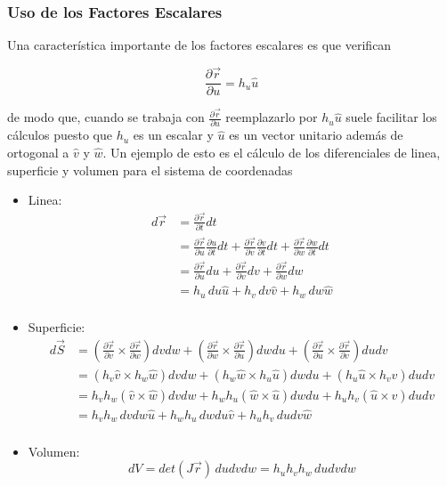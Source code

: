 \subsubsection{Uso de los Factores Escalares}

Una característica importante de los factores escalares es que verifican

\[\frac{\partial\Vec{r}}{\partial u} = h_u\hat{u}\]

de modo que, cuando se trabaja con $\frac{\partial\Vec{r}}{\partial u}$ reemplazarlo por $h_u\hat{u}$ suele facilitar los cálculos puesto que $h_u$ es un escalar y $\hat{u}$ es un vector unitario además de ortogonal a $\hat{v}$ y $\hat{w}$.
\medbreak
Un ejemplo de esto es el cálculo de los diferenciales de linea, superficie y volumen para el sistema de coordenadas
\medbreak
\begin{itemize}
    \item Linea:
    \begin{equation}
    \begin{split}
        d\Vec{r} &= \frac{\partial\Vec{r}}{\partial t}dt\\
        &= \frac{\partial\Vec{r}}{\partial u}
        \frac{\partial u}{\partial t}dt +
        \frac{\partial\Vec{r}}{\partial v}
        \frac{\partial v}{\partial t}dt +
        \frac{\partial\Vec{r}}{\partial w}
        \frac{\partial w}{\partial t}dt\\
        &= \frac{\partial\Vec{r}}{\partial u}du+
        \frac{\partial\Vec{r}}{\partial v}dv+
        \frac{\partial\Vec{r}}{\partial w}dw\\
        &= h_u\,du\hat{u}+h_v\,dv\hat{v}+h_w\,dw\hat{w}\\
    \end{split}
    \nonumber
    \end{equation}
    \item Superficie:
    \begin{equation}
    \begin{split}
        d\Vec{S} &= \left(\frac{\partial\Vec{r}}{\partial v}
        \times\frac{\partial\Vec{r}}{\partial w}\right)dvdw+
        \left(\frac{\partial\Vec{r}}{\partial w}
        \times\frac{\partial\Vec{r}}{\partial u}\right)dwdu+
        \left(\frac{\partial\Vec{r}}{\partial u}
        \times\frac{\partial\Vec{r}}{\partial v}\right)dudv\\
        &= (h_v\hat{v}\times h_w\hat{w})dvdw+
        (h_w\hat{w}\times h_u\hat{u})dwdu+
        (h_u\hat{u}\times h_v\hat{v})dudv\\
        &= h_vh_w(\hat{v}\times\hat{w})dvdw+
        h_wh_u(\hat{w}\times\hat{u})dwdu+
        h_uh_v(\hat{u}\times\hat{v})dudv\\
        &= h_vh_w\,dvdw\hat{u}+
        h_wh_u\,dwdu\hat{v}+
        h_uh_v\,dudv\hat{w}\\
    \end{split}
    \nonumber
    \end{equation}
    \item Volumen: \[dV = det(J\Vec{r})\,dudvdw = h_uh_vh_w\, dudvdw\]
\end{itemize}

